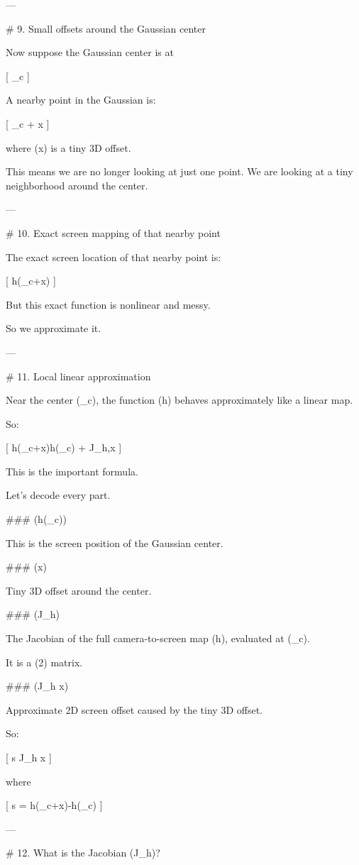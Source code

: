 ---

# 9. Small offsets around the Gaussian center

Now suppose the Gaussian center is at

[
\mu_c
]

A nearby point in the Gaussian is:

[
\mu_c + \delta x
]

where (\delta x) is a tiny 3D offset.

This means we are no longer looking at just one point.
We are looking at a tiny neighborhood around the center.

---

# 10. Exact screen mapping of that nearby point

The exact screen location of that nearby point is:

[
h(\mu_c+\delta x)
]

But this exact function is nonlinear and messy.

So we approximate it.

---

# 11. Local linear approximation

Near the center (\mu_c), the function (h) behaves approximately like a linear map.

So:

[
h(\mu_c+\delta x)\approx h(\mu_c) + J_h,\delta x
]

This is the important formula.

Let’s decode every part.

### (h(\mu_c))

This is the screen position of the Gaussian center.

### (\delta x)

Tiny 3D offset around the center.

### (J_h)

The Jacobian of the full camera-to-screen map (h), evaluated at (\mu_c).

It is a (2) matrix.

### (J_h \delta x)

Approximate 2D screen offset caused by the tiny 3D offset.

So:

[
\delta s \approx J_h \delta x
]

where

[
\delta s = h(\mu_c+\delta x)-h(\mu_c)
]

---

# 12. What is the Jacobian (J_h)?

